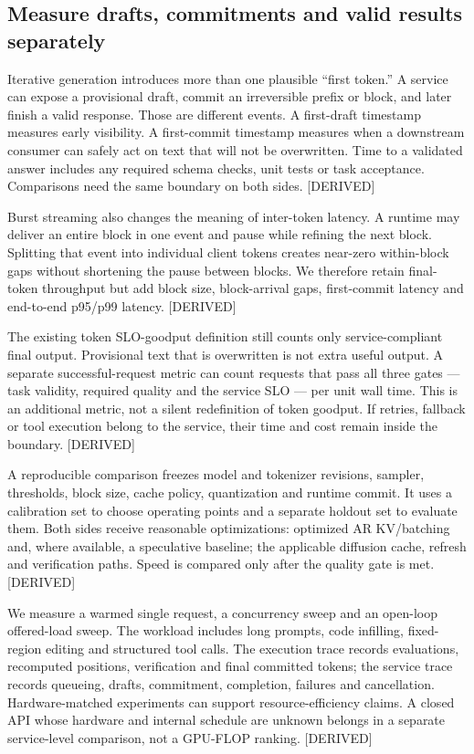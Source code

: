 \subsection{Measure drafts, commitments and valid results
separately}\label{measure-drafts-commitments-and-valid-results-separately}

Iterative generation introduces more than one plausible ``first token.''
A service can expose a provisional draft, commit an irreversible prefix
or block, and later finish a valid response. Those are different events.
A first-draft timestamp measures early visibility. A first-commit
timestamp measures when a downstream consumer can safely act on text
that will not be overwritten. Time to a validated answer includes any
required schema checks, unit tests or task acceptance. Comparisons need
the same boundary on both sides. \mbox{{[}DERIVED{]}}

Burst streaming also changes the meaning of inter-token latency. A
runtime may deliver an entire block in one event and pause while
refining the next block. Splitting that event into individual client
tokens creates near-zero within-block gaps without shortening the pause
between blocks. We therefore retain final-token throughput but add block
size, block-arrival gaps, first-commit latency and end-to-end p95/p99
latency. \mbox{{[}DERIVED{]}}

The existing token SLO-goodput definition still counts only
service-compliant final output. Provisional text that is overwritten is
not extra useful output. A separate successful-request metric can count
requests that pass all three gates --- task validity, required quality
and the service SLO --- per unit wall time. This is an additional
metric, not a silent redefinition of token goodput. If retries, fallback
or tool execution belong to the service, their time and cost remain
inside the boundary. \mbox{{[}DERIVED{]}}

A reproducible comparison freezes model and tokenizer revisions,
sampler, thresholds, block size, cache policy, quantization and runtime
commit. It uses a calibration set to choose operating points and a
separate holdout set to evaluate them. Both sides receive reasonable
optimizations: optimized AR KV/batching and, where available, a
speculative baseline; the applicable diffusion cache, refresh and
verification paths. Speed is compared only after the quality gate is
met. \mbox{{[}DERIVED{]}}

We measure a warmed single request, a concurrency sweep and an open-loop
offered-load sweep. The workload includes long prompts, code infilling,
fixed-region editing and structured tool calls. The execution trace
records evaluations, recomputed positions, verification and final
committed tokens; the service trace records queueing, drafts,
commitment, completion, failures and cancellation. Hardware-matched
experiments can support resource-efficiency claims. A closed API whose
hardware and internal schedule are unknown belongs in a separate
service-level comparison, not a GPU-FLOP ranking. \mbox{{[}DERIVED{]}}

